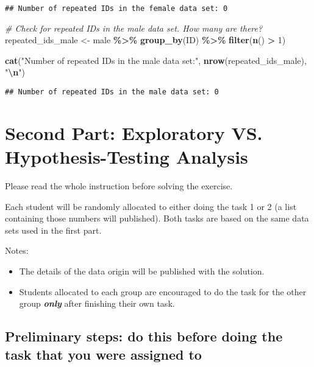 \documentclass[
]{book}
\newenvironment{Shaded}{\begin{snugshade}}{\end{snugshade}}
\newcommand{\CommentTok}[1]{\textcolor[rgb]{0.56,0.35,0.01}{\textit{#1}}}
\newcommand{\DecValTok}[1]{\textcolor[rgb]{0.00,0.00,0.81}{#1}}
\newcommand{\FunctionTok}[1]{\textcolor[rgb]{0.13,0.29,0.53}{\textbf{#1}}}
\newcommand{\NormalTok}[1]{#1}
\newcommand{\OtherTok}[1]{\textcolor[rgb]{0.56,0.35,0.01}{#1}}
\newcommand{\SpecialCharTok}[1]{\textcolor[rgb]{0.81,0.36,0.00}{\textbf{#1}}}
\newcommand{\StringTok}[1]{\textcolor[rgb]{0.31,0.60,0.02}{#1}}
\providecommand{\tightlist}{%
  \setlength{\itemsep}{0pt}\setlength{\parskip}{0pt}}
\begin{document}
\begin{verbatim}
## Number of repeated IDs in the female data set: 0
\end{verbatim}

\begin{Shaded}
\begin{Highlighting}[]
\CommentTok{\# Check for repeated IDs in the male data set. How many are there?}
\NormalTok{repeated\_ids\_male }\OtherTok{\textless{}{-}}\NormalTok{ male }\SpecialCharTok{\%\textgreater{}\%}
  \FunctionTok{group\_by}\NormalTok{(ID) }\SpecialCharTok{\%\textgreater{}\%}
  \FunctionTok{filter}\NormalTok{(}\FunctionTok{n}\NormalTok{() }\SpecialCharTok{\textgreater{}} \DecValTok{1}\NormalTok{)}

\FunctionTok{cat}\NormalTok{(}\StringTok{"Number of repeated IDs in the male data set:"}\NormalTok{, }\FunctionTok{nrow}\NormalTok{(repeated\_ids\_male), }\StringTok{"}\SpecialCharTok{\textbackslash{}n}\StringTok{"}\NormalTok{)}
\end{Highlighting}
\end{Shaded}

\begin{verbatim}
## Number of repeated IDs in the male data set: 0
\end{verbatim}

\hypertarget{second-part-exploratory-vs.-hypothesis-testing-analysis}{%
\section{Second Part: Exploratory VS. Hypothesis-Testing Analysis}\label{second-part-exploratory-vs.-hypothesis-testing-analysis}}

Please read the whole instruction before solving the exercise.

Each student will be randomly allocated to either doing the task 1 or 2 (a list containing those numbers will published). Both tasks are based on the same data sets used in the first part.

Notes:

\begin{itemize}
\tightlist
\item
  The details of the data origin will be published with the solution.
\item
  Students allocated to each group are encouraged to do the task for the other group \textbf{\emph{only}} after finishing their own task.
\end{itemize}

\hypertarget{preliminary-steps-do-this-before-doing-the-task-that-you-were-assigned-to}{%
\subsection{Preliminary steps: do this before doing the task that you were assigned to}\label{preliminary-steps-do-this-before-doing-the-task-that-you-were-assigned-to}}
\end{document}
